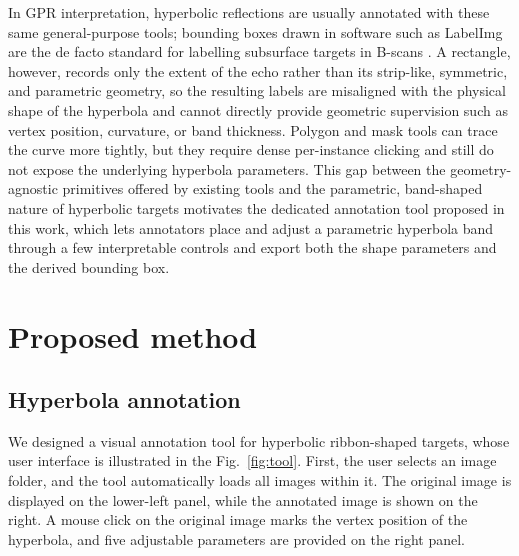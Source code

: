\documentclass[lettersize,journal]{IEEEtran}
\begin{document}
In GPR interpretation, hyperbolic reflections are usually annotated with these same general-purpose tools; bounding boxes drawn in software such as LabelImg are the de facto standard for labelling subsurface targets in B-scans \cite{CBAM}. A rectangle, however, records only the extent of the echo rather than its strip-like, symmetric, and parametric geometry, so the resulting labels are misaligned with the physical shape of the hyperbola and cannot directly provide geometric supervision such as vertex position, curvature, or band thickness. Polygon and mask tools can trace the curve more tightly, but they require dense per-instance clicking and still do not expose the underlying hyperbola parameters. This gap between the geometry-agnostic primitives offered by existing tools and the parametric, band-shaped nature of hyperbolic targets motivates the dedicated annotation tool proposed in this work, which lets annotators place and adjust a parametric hyperbola band through a few interpretable controls and export both the shape parameters and the derived bounding box.


\section{Proposed method}
\subsection{Hyperbola annotation}
We designed a visual annotation tool for hyperbolic ribbon-shaped targets, whose user interface is illustrated in the Fig.~\ref{fig:tool}.
First, the user selects an image folder, and the tool automatically loads all images within it.
The original image is displayed on the lower-left panel, while the annotated image is shown on the right.
A mouse click on the original image marks the vertex position of the hyperbola, and five adjustable parameters are provided on the right panel.
\end{document}
